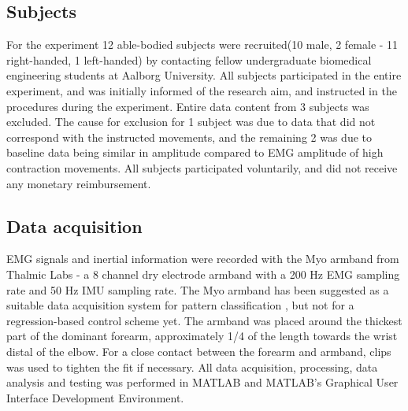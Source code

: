 \subsection{Subjects}
For the experiment 12 able-bodied subjects were recruited(10 male, 2 female - 11 right-handed, 1 left-handed) by contacting fellow undergraduate biomedical engineering students at Aalborg University. All subjects participated in the entire experiment, and was initially informed of the research aim, and instructed in the procedures during the experiment. Entire data content from 3 subjects was excluded. The cause for exclusion for 1 subject was due to data that did not correspond with the instructed movements, and the remaining 2 was due to baseline data being similar in amplitude compared to EMG amplitude of high contraction movements. All subjects participated voluntarily, and did not receive any monetary reimbursement. 

\subsection{Data acquisition}
EMG signals and inertial information were recorded with the Myo armband from Thalmic Labs - a 8 channel dry electrode armband with a 200 Hz EMG sampling rate and 50 Hz IMU sampling rate. The Myo armband has been suggested as a suitable data acquisition system for pattern classification \cite{Mendez2017}, but not for a regression-based control scheme yet. 
The armband was placed around the thickest part of the dominant forearm, approximately 1/4 of the length towards the wrist distal of the elbow. For a close contact between the forearm and armband, clips was used to tighten the fit if necessary. All data acquisition, processing, data analysis and testing was performed in MATLAB and MATLAB's Graphical User Interface Development Environment.


